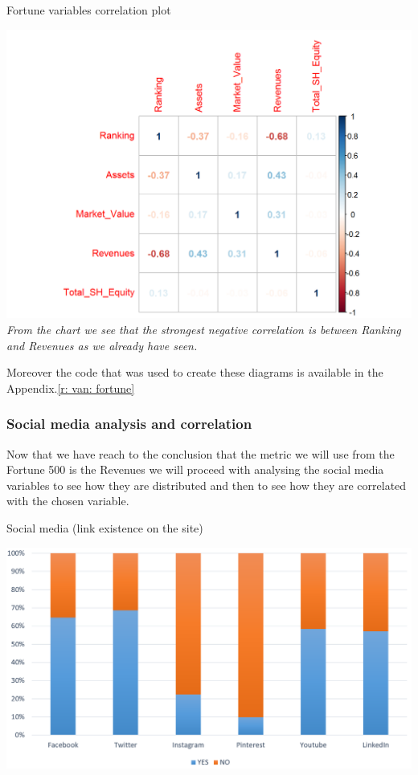\documentclass{book}
\begin{document}
\begin{table}[H]
\centering
\caption{Fortune variables correlation plot}
\begin{center}
\includegraphics[scale=0.5]{../R/photos/09_rank_corplot_f500.png}   \\
\textit{From the chart we see that the strongest negative correlation is between Ranking and Revenues as we already have seen.}
\end{center}
\end{table}
Moreover the code that was used to create these diagrams is available in the Appendix.\ref{r: van: fortune}

\subsubsection{Social media analysis and correlation}
Now that we have reach to the conclusion that the metric we will use from the Fortune 500 is the Revenues we will proceed with analysing the social media variables to see how they are distributed and then to see how they are correlated with the chosen variable.\\
\begin{table}[H]
\centering
\caption{Social media (link existence on the site)}
\begin{center}
\includegraphics[scale=0.6]{../R/photos/10_socialmedia.png}
\end{center}
\end{table}
\end{document}
